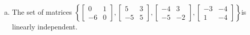 \begin{exerciseAnswer}
\begin{enumerate}[(a)]
\item The set of matrices \( \left\{ \left[\begin{array}{cc}
0 & 1 \\
-6 & 0
\end{array}\right] , \left[\begin{array}{cc}
5 & 3 \\
-5 & 5
\end{array}\right] , \left[\begin{array}{cc}
-4 & 3 \\
-5 & -2
\end{array}\right] , \left[\begin{array}{cc}
-3 & -4 \\
1 & -4
\end{array}\right] \right\} \)is linearly independent.
\end{enumerate}
    
\end{exerciseAnswer}
    
